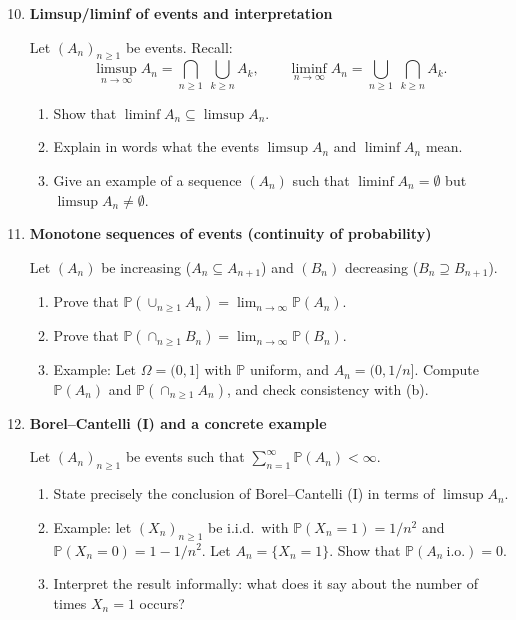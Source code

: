 \documentclass[11pt]{article}
\begin{document}
\begin{enumerate}[leftmargin=*, itemsep=1.2em]
\setcounter{enumi}{9} %

\item \textbf{Limsup/liminf of events and interpretation}

Let $(A_n)_{n\ge 1}$ be events. Recall:
\[
\limsup_{n\to\infty}A_n=\bigcap_{n\ge1}\ \bigcup_{k\ge n} A_k,
\qquad
\liminf_{n\to\infty}A_n=\bigcup_{n\ge1}\ \bigcap_{k\ge n} A_k.
\]
\begin{enumerate}[label=(\alph*)]
\item Show that $\liminf A_n \subseteq \limsup A_n$.
\item Explain in words what the events $\limsup A_n$ and $\liminf A_n$ mean.
\item Give an example of a sequence $(A_n)$ such that $\liminf A_n=\emptyset$ but $\limsup A_n\neq\emptyset$.
\end{enumerate}

\item \textbf{Monotone sequences of events (continuity of probability)}

Let $(A_n)$ be increasing ($A_n\subseteq A_{n+1}$) and $(B_n)$ decreasing ($B_n\supseteq B_{n+1}$).
\begin{enumerate}[label=(\alph*)]
\item Prove that $\mathbb{P}(\cup_{n\ge1}A_n)=\lim_{n\to\infty}\mathbb{P}(A_n)$.
\item Prove that $\mathbb{P}(\cap_{n\ge1}B_n)=\lim_{n\to\infty}\mathbb{P}(B_n)$.
\item Example: Let $\Omega=(0,1]$ with $\mathbb{P}$ uniform, and $A_n=(0,1/n]$.
Compute $\mathbb{P}(A_n)$ and $\mathbb{P}(\cap_{n\ge1}A_n)$, and check consistency with (b).
\end{enumerate}

\item \textbf{Borel--Cantelli (I) and a concrete example}

Let $(A_n)_{n\ge1}$ be events such that $\sum_{n=1}^\infty \mathbb{P}(A_n)<\infty$.
\begin{enumerate}[label=(\alph*)]
\item State precisely the conclusion of Borel--Cantelli (I) in terms of $\limsup A_n$.
\item Example: let $(X_n)_{n\ge1}$ be i.i.d.\ with $\mathbb{P}(X_n=1)=1/n^2$ and $\mathbb{P}(X_n=0)=1-1/n^2$.
Let $A_n=\{X_n=1\}$. Show that $\mathbb{P}(A_n\ \text{i.o.})=0$.
\item Interpret the result informally: what does it say about the number of times $X_n=1$ occurs?
\end{enumerate}


\end{enumerate}
\end{document}
